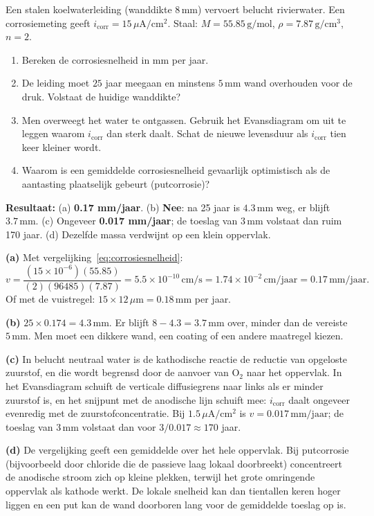 \begin{oefening}
Een stalen koelwaterleiding (wanddikte \(8\,\mathrm{mm}\)) vervoert belucht rivierwater. Een corrosiemeting geeft \(i_\mathrm{corr} = 15\,\mu\mathrm{A/cm^2}\). Staal: \(M = 55.85\,\mathrm{g/mol}\), \(\rho = 7.87\,\mathrm{g/cm^3}\), \(n = 2\).

\begin{enumerate}
\item[(a)]
  Bereken de corrosiesnelheid in mm per jaar.
\item[(b)]
  De leiding moet \(25\) jaar meegaan en minstens \(5\,\mathrm{mm}\) wand overhouden voor de druk. Volstaat de huidige wanddikte?
\item[(c)]
  Men overweegt het water te ontgassen. Gebruik het Evansdiagram om uit te leggen waarom \(i_\mathrm{corr}\) dan sterk daalt. Schat de nieuwe levensduur als \(i_\mathrm{corr}\) tien keer kleiner wordt.
\item[(d)]
  Waarom is een gemiddelde corrosiesnelheid gevaarlijk optimistisch als de aantasting plaatselijk gebeurt (putcorrosie)?
\end{enumerate}
\end{oefening}
\begin{oplossing}
\textbf{Resultaat:} (a) \textbf{0.17 mm/jaar}. (b) \textbf{Nee}: na 25 jaar is \(4.3\,\mathrm{mm}\) weg, er blijft \(3.7\,\mathrm{mm}\). (c) Ongeveer \textbf{0.017 mm/jaar}; de toeslag van \(3\,\mathrm{mm}\) volstaat dan ruim 170 jaar. (d) Dezelfde massa verdwijnt op een klein oppervlak.

\textbf{(a)} Met vergelijking~\eqref{eq:corrosiesnelheid}:
\[
v = \frac{(15\times10^{-6})(55.85)}{(2)(96485)(7.87)} = 5.5\times10^{-10}\,\mathrm{cm/s} = 1.74\times10^{-2}\,\mathrm{cm/jaar} = 0.17\,\mathrm{mm/jaar}.
\]
Of met de vuistregel: \(15 \times 12\,\mu\mathrm{m} = 0.18\,\mathrm{mm}\) per jaar.

\textbf{(b)} \(25 \times 0.174 = 4.3\,\mathrm{mm}\). Er blijft \(8 - 4.3 = 3.7\,\mathrm{mm}\) over, minder dan de vereiste \(5\,\mathrm{mm}\). Men moet een dikkere wand, een coating of een andere maatregel kiezen.

\textbf{(c)} In belucht neutraal water is de kathodische reactie de reductie van opgeloste zuurstof, en die wordt begrensd door de aanvoer van \(\mathrm{O_2}\) naar het oppervlak. In het Evansdiagram schuift de verticale diffusiegrens naar links als er minder zuurstof is, en het snijpunt met de anodische lijn schuift mee: \(i_\mathrm{corr}\) daalt ongeveer evenredig met de zuurstofconcentratie. Bij \(1.5\,\mu\mathrm{A/cm^2}\) is \(v = 0.017\,\mathrm{mm/jaar}\); de toeslag van \(3\,\mathrm{mm}\) volstaat dan voor \(3/0.017 \approx 170\) jaar.

\textbf{(d)} De vergelijking geeft een gemiddelde over het hele oppervlak. Bij putcorrosie (bijvoorbeeld door chloride die de passieve laag lokaal doorbreekt) concentreert de anodische stroom zich op kleine plekken, terwijl het grote omringende oppervlak als kathode werkt. De lokale snelheid kan dan tientallen keren hoger liggen en een put kan de wand doorboren lang voor de gemiddelde toeslag op is.
\end{oplossing}

